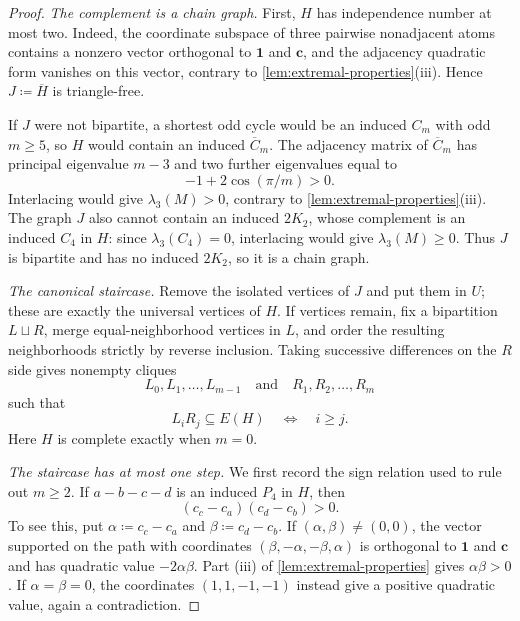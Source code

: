\documentclass[10pt]{article}
\numberwithin{equation}{section}
\newcommand{\one}{\mathbf 1}
\newcommand{\vct}[1]{\boldsymbol{#1}}
\begin{document}
\begin{proof}
\smallskip
\noindent\emph{The complement is a chain graph.}
First, $H$ has independence number at most two.  Indeed, the coordinate subspace of three pairwise nonadjacent atoms contains a nonzero vector orthogonal to $\one$ and $\vct c$, and the adjacency quadratic form vanishes on this vector, contrary to \cref{lem:extremal-properties}(iii).  Hence $J\coloneqq\overline H$ is triangle-free.

If $J$ were not bipartite, a shortest odd cycle would be an induced $C_m$ with odd $m\ge5$, so $H$ would contain an induced $\overline C_m$.  The adjacency matrix of $\overline C_m$ has principal eigenvalue $m-3$ and two further eigenvalues equal to
\[
 -1+2\cos(\pi/m)>0.
\]
Interlacing would give $\lambda_3(M)>0$, contrary to \cref{lem:extremal-properties}(iii).  The graph $J$ also cannot contain an induced $2K_2$, whose complement is an induced $C_4$ in $H$: since $\lambda_3(C_4)=0$, interlacing would give $\lambda_3(M)\ge0$.  Thus $J$ is bipartite and has no induced $2K_2$, so it is a chain graph.

\smallskip
\noindent\emph{The canonical staircase.}
Remove the isolated vertices of $J$ and put them in $U$; these are exactly the universal vertices of $H$.  If vertices remain, fix a bipartition $L\sqcup R$, merge equal-neighborhood vertices in $L$, and order the resulting neighborhoods strictly by reverse inclusion.  Taking successive differences on the $R$ side gives nonempty cliques
\[
 L_0,L_1,\ldots,L_{m-1}
 \quad\text{and}\quad
 R_1,R_2,\ldots,R_m
\]
such that
\begin{equation}\label{eq:Ferrers-adjacency}
 L_iR_j\subseteq E(H)\quad\Longleftrightarrow\quad i\ge j.
\end{equation}
Here $H$ is complete exactly when $m=0$.

\smallskip
\noindent\emph{The staircase has at most one step.}
We first record the sign relation used to rule out $m\ge2$.  If $a-b-c-d$ is an induced $P_4$ in $H$, then
\begin{equation}\label{eq:P4-sign-rule}
 (c_c-c_a)(c_d-c_b)>0.
\end{equation}
To see this, put $\alpha\coloneqq c_c-c_a$ and $\beta\coloneqq c_d-c_b$.  If $(\alpha,\beta)\ne(0,0)$, the vector supported on the path with coordinates $(\beta,-\alpha,-\beta,\alpha)$ is orthogonal to $\one$ and $\vct c$ and has quadratic value $-2\alpha\beta$.  Part \textup{(iii)} of \cref{lem:extremal-properties} gives $\alpha\beta>0$.  If $\alpha=\beta=0$, the coordinates $(1,1,-1,-1)$ instead give a positive quadratic value, again a contradiction.


\end{proof}
\end{document}
